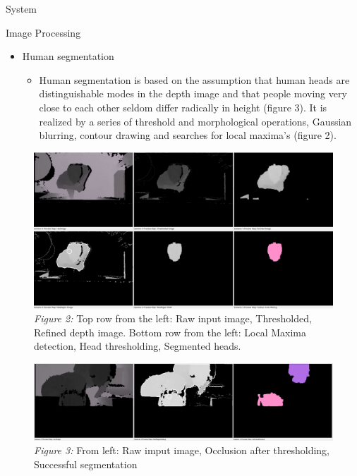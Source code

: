 \documentclass[final,hyperref={pdfpagelabels=false}]{beamer}
\begin{document}
\begin{frame}[t]
\begin{columns}[t]
\begin{column}{.465\textwidth}
\begin{block}{System}
\end{block}


\begin{block}{Image Processing}
\begin{itemize}
	\item Human segmentation
	\begin{itemize}
	\item Human segmentation is based on the assumption that human heads are distinguishable modes in the depth image and that people moving very close to each other seldom differ radically in height (figure 3). It is realized by a series of threshold and morphological operations, Gaussian blurring, contour drawing and searches for local maxima's (figure 2).
	\end{itemize}
\end{itemize}
\begin{figure}
	\includegraphics[width=0.9\linewidth]{humanSegmentationSteps.png}
	\caption{\centering \textit{Figure 2:} Top row from the left: Raw input image, Thresholded, Refined depth image. \newline 
			 			 Bottom row from the left: Local Maxima detection, Head thresholding, Segmented heads. }
\end{figure}
\begin{figure}
	\includegraphics[width=0.9\linewidth]{KinectSegmentationIllustration_occlusionHandling_horizontal.png}
	\caption{\textit{Figure 3:} From left: Raw imput image, Occlusion after thresholding, Successful segmentation}
\end{figure}


\end{block}
\end{column}
\end{columns}
\end{frame}
\end{document}
